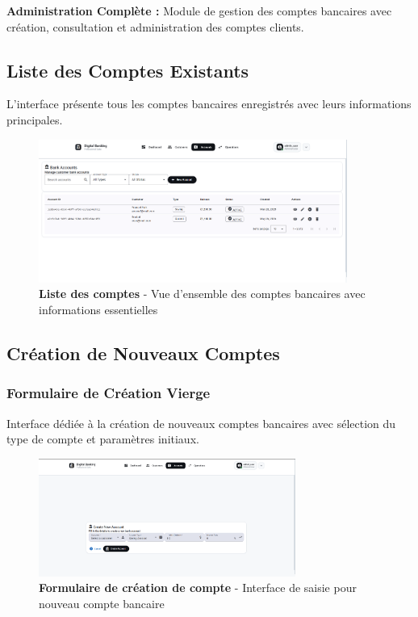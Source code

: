 \documentclass[11pt, a4paper]{article}
\begin{document}
\textbf{Administration Complète :} Module de gestion des comptes bancaires avec création, consultation et administration des comptes clients.

\subsection{Liste des Comptes Existants}

L'interface présente tous les comptes bancaires enregistrés avec leurs informations principales.

\begin{figure}[H]
    \centering
    \includegraphics[width=0.9\textwidth]{screenshots/05_01_account_list_initial.png}
    \caption{\textbf{Liste des comptes} - Vue d'ensemble des comptes bancaires avec informations essentielles}
    \label{fig:account_list_initial}
\end{figure}

\subsection{Création de Nouveaux Comptes}

\subsubsection{Formulaire de Création Vierge}

Interface dédiée à la création de nouveaux comptes bancaires avec sélection du type de compte et paramètres initiaux.

\begin{figure}[H]
    \centering
    \includegraphics[width=0.75\textwidth]{screenshots/05_02_account_form_new_empty.png}
    \caption{\textbf{Formulaire de création de compte} - Interface de saisie pour nouveau compte bancaire}
    \label{fig:account_form_new_empty}
\end{figure}
\end{document}
